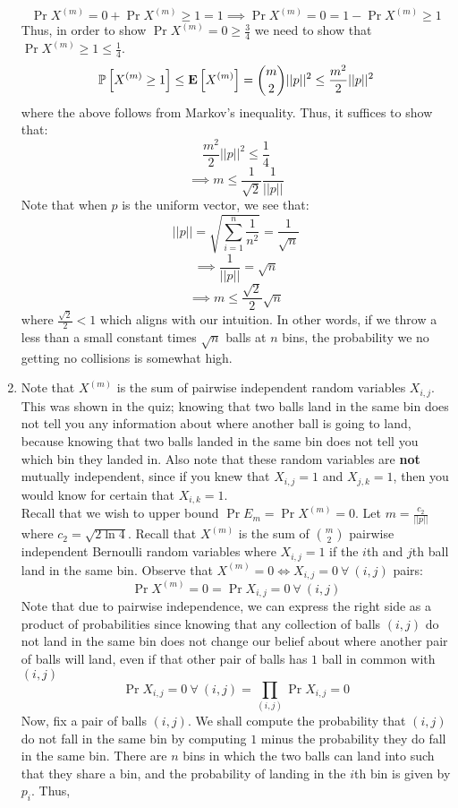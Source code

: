 \documentclass[12pt]{article}
\begin{document}
\begin{solution}
\begin{enumerate}[label=(\alph*)]
    \[
    \Pr{X^{(m)}=0} + \Pr{X^{(m)} \geq 1} = 1 \implies \Pr{X^{(m)}=0} = 1 -  \Pr{X^{(m)} \geq 1}
    \]
    Thus, in order to show $\Pr{X^{(m)}=0} \geq \frac{3}{4}$ we need to show that $\Pr{X^{(m)} \geq 1} \leq \frac{1}{4}$. 
    \[
    \mathbb{P}\left[X^{(m)} \geq 1\right] \leq \mathbf{E}\left[X^{(m)}\right] = \binom{m}{2} ||p||^2 \leq \frac{m^2}{2}||p||^2
    \]
    where the above follows from Markov's inequality. Thus, it suffices to show that:
    \[
    \frac{m^2}{2}||p||^2 \leq \frac{1}{4}
    \]
    \[
    \implies m \leq \frac{1}{\sqrt{2}} \frac{1}{||p||}
    \]
    Note that when $p$ is the uniform vector, we see that:
    \[
    ||p|| = \sqrt{\sum_{i=1}^{n}{\frac{1}{n^2}}} = \frac{1}{\sqrt{n}}
    \]
    \[
    \implies \frac{1}{||p||} = \sqrt{n}
    \]
    \[
    \implies m \leq \frac{\sqrt{2}}{2}\sqrt{n}
    \]
    where $\frac{\sqrt{2}}{2} < 1$ which aligns with our intuition. In other words, if we throw a less than a small constant times $\sqrt{n}$ balls at $n$ bins, the probability we no getting no collisions is somewhat high.
    \item Note that $X^{(m)}$ is the sum of pairwise independent random variables $X_{i,j}$. This was shown in the quiz; knowing that two balls land in the same bin does not tell you any information about where another ball is going to land, because knowing that two balls landed in the same bin does not tell you which bin they landed in. Also note that these random variables are \textbf{not} mutually independent, since if you knew that $X_{i,j} = 1$ and $X_{j,k} = 1$, then you would know for certain that $X_{i,k} = 1$. \\
    Recall that we wish to upper bound $\Pr{E_m} = \Pr{X^{(m)} = 0}$. Let $m = \frac{c_2}{||p||}$ where $c_{2} = \sqrt{2\ln{4}}$. Recall that $X^{(m)}$ is the sum of $\binom{m}{2}$ pairwise independent Bernoulli random variables where $X_{i,j}=1$ if the $i$th and $j$th ball land in the same bin. Observe that $X^{(m)} = 0 \iff X_{i,j}=0~\forall~(i,j)$ pairs:
    \[
    \Pr{X^{(m)} = 0} = \Pr{X_{i,j}=0~\forall~(i,j)}
    \]
    Note that due to pairwise independence, we can express the right side as a product of probabilities since knowing that any collection of balls $(i,j)$ do not land in the same bin does not change our belief about where another pair of balls will land, even if that other pair of balls has $1$ ball in common with $(i,j)$
    \[
    \Pr{X_{i,j}=0~\forall~(i,j)} = \prod_{(i,j)}{\Pr{X_{i,j}=0}}
    \]
    Now, fix a pair of balls $(i,j)$. We shall compute the probability that $(i,j)$ do not fall in the same bin by computing $1$ minus the probability they do fall in the same bin. There are $n$ bins in which the two balls can land into such that they share a bin, and the probability of landing in the $i$th bin is given by $p_i$. Thus, 

\end{enumerate}
\end{solution}
\end{document}
